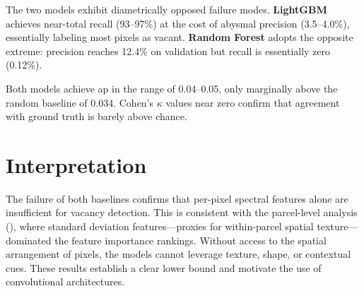 The two models exhibit diametrically opposed failure modes. \textbf{LightGBM} achieves near-total recall (93--97\%) at the cost of abysmal precision (3.5--4.0\%), essentially labeling most pixels as vacant. \textbf{Random Forest} adopts the opposite extreme: precision reaches 12.4\% on validation but recall is essentially zero (0.12\%).

Both models achieve \acrshort{ap} in the range of 0.04--0.05, only marginally above the random baseline of 0.034. Cohen's $\kappa$ values near zero confirm that agreement with ground truth is barely above chance.

\section{Interpretation}

The failure of both baselines confirms that per-pixel spectral features alone are insufficient for vacancy detection. This is consistent with the parcel-level analysis (), where standard deviation features---proxies for within-parcel spatial texture---dominated the feature importance rankings. Without access to the spatial arrangement of pixels, the models cannot leverage texture, shape, or contextual cues. These results establish a clear lower bound and motivate the use of convolutional architectures.
